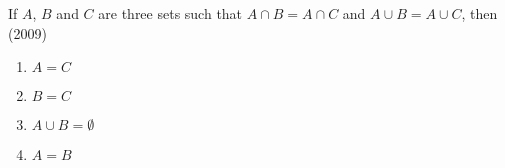     \item If $A$, $B$ and $C$ are three sets such that $A \cap B = A \cap C$
        and $A \cup B = A \cup C$, then
        \hfill (2009)
        
        \begin{multicols}{2}
            \begin{enumerate}
                \item $A = C$
                \item $B = C$
                \item $A \cup B = \emptyset$
                \item $A = B$
            \end{enumerate}
        \end{multicols}
